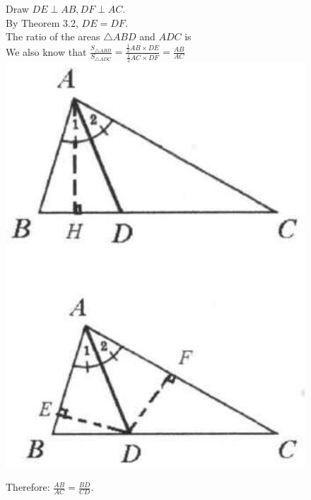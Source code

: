 \documentclass{article}
\begin{document}
Draw \(D E \perp A B, D F \perp A C\).\\
By Theorem 3.2, \(D E=D F\).\\
The ratio of the areas \(\triangle A B D\) and \(A D C\) is\\
We also know that \(\frac{S_{\triangle A B D}}{S_{\triangle A D C}}=\frac{\frac{1}{2} A B \times D E}{\frac{1}{2} A C \times D F}=\frac{A B}{A C}\)\\
\centering
\includegraphics[width=\textwidth]{images/075(2).jpg}


Therefore: \(\frac{A B}{A C}=\frac{B D}{C D}\).
\end{document}
